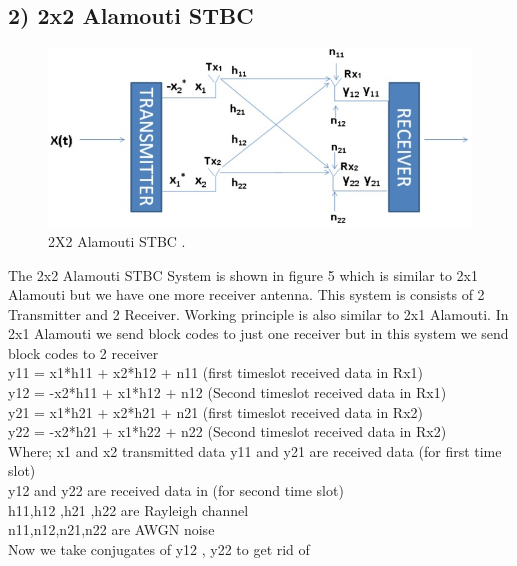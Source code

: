 \documentclass[12pt]{report}
\begin{document}
\subsection*{2) 2x2 Alamouti STBC}
\begin{figure}[!hbt]
\begin{center}
		\includegraphics[width=\columnwidth]{C}
		\caption{2X2 Alamouti STBC  .}
		\label{fig:tf_plot}
		\end{center}
	\end{figure}
    The 2x2 Alamouti STBC System is shown in figure 5
which is similar to 2x1 Alamouti but we have one more
receiver antenna. This system is consists of 2 Transmitter
and 2 Receiver. Working principle is also similar to 2x1
Alamouti. In 2x1 Alamouti we send block codes to just
one receiver but in this system we send block codes to 2
receiver\\
y11 = x1*h11 + x2*h12 + n11 (first timeslot received data in Rx1) \\
y12 = -x2*h11 + x1*h12 + n12 (Second timeslot received data in Rx1)\\
y21 = x1*h21 + x2*h21 + n21 (first timeslot received data in Rx2)\\
 y22 = -x2*h21 + x1*h22 + n22 (Second timeslot received data in Rx2)\\
 Where;
x1 and x2 transmitted data
y11 and y21 are received data (for first time slot)\\
y12 and y22 are received data in (for second time slot)\\
h11,h12 ,h21 ,h22 are Rayleigh channel\\
n11,n12,n21,n22 are AWGN noise\\
Now we take conjugates of y12 , y22 to get rid of
\end{document}
